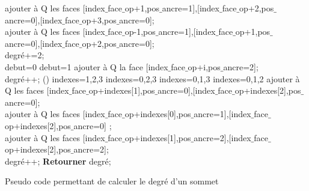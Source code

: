 \documentclass[a4paper,11pt,openany]{article}
\begin{document}
\begin{appendices}
\begin{algorithm}[th]
{{{{{{        				ajouter à Q les faces [index$\_$face$\_$op+1,pos$\_$ancre=1],[index$\_$face$\_$op+2,pos$\_$ancre=0],[index$\_$face$\_$op+3,pos$\_$ancre=0];\\
        			}
        			{
        				ajouter à Q les faces [index$\_$face$\_$op-1,pos$\_$ancre=1],[index$\_$face$\_$op+1,pos$\_$ancre=0],[index$\_$face$\_$op+2,pos$\_$ancre=0];\\
        			}
        			degré+=2;\\
        		}
        		{
        			{
        				debut=0
        			}
        			{
        				debut=1
        			}
        			{
        				ajouter à Q la face [index$\_$face$\_$op+i,pos$\_$ancre=2];\\
        				degré++;
        			}
        		}
        	}
        	()
        	{
        		{
        			indexes={1,2,3}
        		}
        		{
        			indexes={0,2,3}
        		}
        		{
        			indexes={0,1,3}
        		}
        		{
        			indexes={0,1,2}
        		}
        		{
        			ajouter à Q les faces [index$\_$face$\_$op+indexes[1],pos$\_$ancre=0],[index$\_$face$\_$op+indexes[2],pos$\_$ancre=0];\\
        		}
        		{
        			ajouter à Q les faces [index$\_$face$\_$op+indexes[0],pos$\_$ancre=1],[index$\_$face$\_$op+indexes[2],pos$\_$ancre=0] ;\\
        		}
        		{
        		ajouter à Q les faces [index$\_$face$\_$op+indexes[1],pos$\_$ancre=2],[index$\_$face$\_$op+indexes[2],pos$\_$ancre=2];\\
        		}
        		degré++;
        	}
        }
   	}
	\textbf{Retourner} degré;\\
 }
\caption{Pseudo code permettant de calculer le degré d'un sommet}
\end{algorithm}
\end{appendices}
\end{document}
